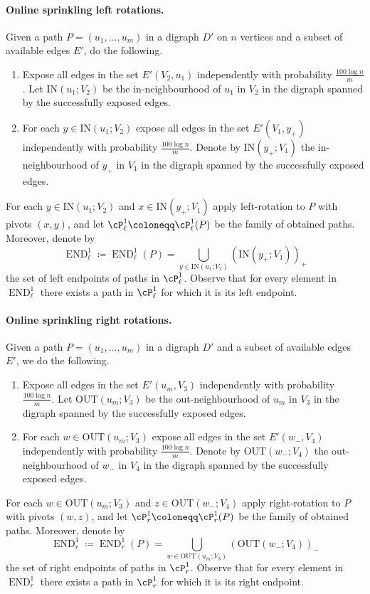 \documentclass{article}
\DeclareMathOperator{\END}{END}
\newcommand{\IN}[2]{\text{IN}\left(#1; #2 \right)}
\newcommand{\OUT}[2]{\text{OUT}\left(#1; #2 \right)}
\begin{document}
	
	\paragraph*{Online sprinkling left rotations.}
	Given a path $P = (u_1, \ldots, u_m)$ in a digraph $D'$ on $n$ vertices and a subset of available edges $E'$, do the following.
	\begin{enumerate}
		\item Expose all edges in the set $E'\left(V_2, u_1 \right)$ independently with probability $\frac{100\log n}{m}$.
		Let $\IN{u_1}{V_2}$ be the in-neighbourhood of $u_1$ in $V_2$ in the digraph spanned by the successfully exposed edges.
		\item For each $y \in \IN{u_1}{V_2}$ expose all edges in the set $E'\left(V_1, y_+ \right)$ independently with probability $\frac{100\log n}{m}$.
		Denote by $\IN{y_+}{V_1}$ the in-neighbourhood of $y_+$ in $V_1$ in the digraph spanned by the successfully exposed edges.
	\end{enumerate}
	For each $y \in \IN{u_1}{V_2}$ and $x \in \IN{y_+}{V_1}$ apply left-rotation to $P$ with pivots $(x,y)$, and let $\cP_{\ell}^1 \coloneqq \cP_{\ell}^1(P)$ be the family of obtained paths.
	Moreover, denote by
	\[\END_{\ell}^1 \coloneqq \END_{\ell}^1(P) = \bigcup_{y \in \IN{u_1}{V_2}} \left(\IN{y_+}{V_1} \right)_+ \]
	the set of left endpoints of paths in $\cP_{\ell}^1$.
	Observe that for every element in $\END_{\ell}^1$ there exists a path in $\cP_{\ell}^1$ for which it is its left endpoint.
	
	\paragraph*{Online sprinkling right rotations.}
	Given a path $P = (u_1, \ldots, u_m)$ in a digraph $D'$ and a subset of available edges $E'$, we do the following.
	\begin{enumerate}
		\item Expose all edges in the set $E'\left(u_m, V_3 \right)$ independently with probability $\frac{100\log n}{m}$.
		Let $\OUT{u_m}{V_3}$ be the out-neighbourhood of $u_m$ in $V_3$ in the digraph spanned by the successfully exposed edges.
		\item For each $w \in \OUT{u_m}{V_3}$ expose all edges in the set $E'\left(w_-,V_4 \right)$ independently with probability $\frac{100\log n}{m}$.
		Denote by $\OUT{w_-}{V_4}$ the out-neighbourhood of $w_-$ in $V_4$ in the digraph spanned by the successfully exposed edges.
	\end{enumerate}
	For each $w \in \OUT{u_m}{V_3}$ and $z \in \OUT{w_-}{V_4}$ apply right-rotation to $P$ with pivots $(w,z)$, and let $\cP_r^1 \coloneqq \cP_r^1(P)$ be the family of obtained paths.
	Moreover, denote by
	\[\END_r^1 \coloneqq \END_r^1(P) = \bigcup_{w \in \OUT{u_m}{V_3}} \left(\OUT{w_-}{V_4} \right)_- \]
	the set of right endpoints of paths in $\cP_r^1$.
	Observe that for every element in $\END_r^1$ there exists a path in $\cP_r^1$ for which it is its right endpoint.
	
\end{document}
